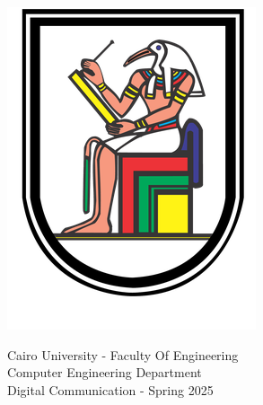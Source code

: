 \documentclass{article}
\begin{document}
\begin{titlepage}
    \begin{center}
        \begin{minipage}[c]{0.12\textwidth}
            \includegraphics[width=\textwidth]{Cairo_University_Crest.png}
        \end{minipage}
        \hfill
        \begin{minipage}[c]{0.5\textwidth}
            \centering
            {\large Cairo University - Faculty Of Engineering \\ Computer Engineering Department \\ Digital Communication  - Spring 2025 \par}
        \end{minipage}
        \hfill
        \begin{minipage}[c]{0.15\textwidth}

\end{minipage}
\end{center}
\end{titlepage}
\end{document}
